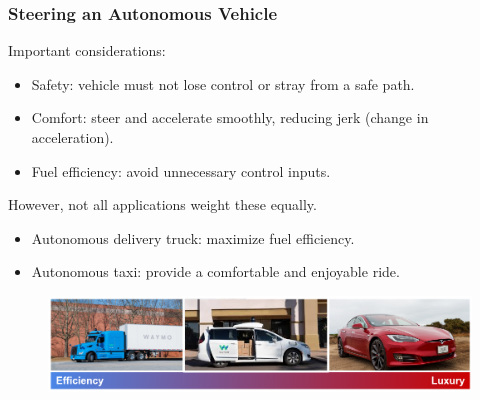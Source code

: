 \documentclass{beamer}
\begin{document}
\begin{frame}
\frametitle{Steering an Autonomous Vehicle}
Important considerations:
\begin{itemize}
\item Safety: vehicle must not lose control or stray from a safe path.
\item Comfort: steer and accelerate smoothly, reducing jerk (change in acceleration).
\item Fuel efficiency: avoid unnecessary control inputs.
\end{itemize}

However, not all applications weight these equally.
\begin{itemize}
\item Autonomous delivery truck: maximize fuel efficiency.
\item Autonomous taxi: provide a comfortable and enjoyable ride.
\end{itemize}

\begin{figure}
	\includegraphics[width=1.0\linewidth]{figures/configurability.png}
\end{figure}
\end{frame}
\end{document}
